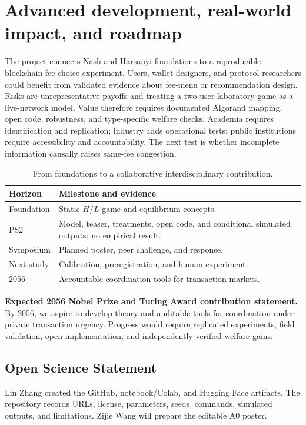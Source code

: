 \section{Advanced development, real-world impact, and roadmap}
The project connects Nash and Harsanyi foundations to a reproducible blockchain fee-choice experiment. Users, wallet designers, and protocol researchers could benefit from validated evidence about fee-menu or recommendation design. Risks are unrepresentative payoffs and treating a two-user laboratory game as a live-network model. Value therefore requires documented Algorand mapping, open code, robustness, and type-specific welfare checks. Academia requires identification and replication; industry adds operational tests; public institutions require accessibility and accountability. The next test is whether incomplete information causally raises same-fee congestion.

\begin{table}[h]\caption{From foundations to a collaborative interdisciplinary contribution.}
\begin{tabularx}{\columnwidth}{@{}p{1.6cm}Y@{}}\toprule
\textbf{Horizon}&\textbf{Milestone and evidence}\\\midrule
Foundation&Static $H/L$ game and equilibrium concepts.\\
PS2&Model, teaser, treatments, open code, and conditional simulated outputs; no empirical result.\\
Symposium&Planned poster, peer challenge, and response.\\
Next study&Calibration, preregistration, and human experiment.\\
2056&Accountable coordination tools for transaction markets.\\\bottomrule
\end{tabularx}\end{table}

\noindent\textbf{Expected 2056 Nobel Prize and Turing Award contribution statement.}
By 2056, we aspire to develop theory and auditable tools for coordination under private transaction urgency. Progress would require replicated experiments, field validation, open implementation, and independently verified welfare gains.

\subsection*{Open Science Statement}
Lin Zhang created the GitHub, notebook/Colab, and Hugging Face artifacts. The repository records URLs, license, parameters, seeds, commands, simulated outputs, and limitations. Zijie Wang will prepare the editable A0 poster.

